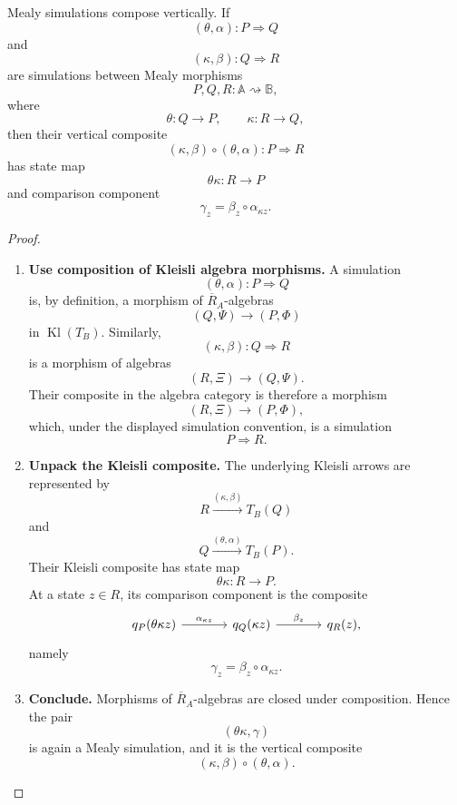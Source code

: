 \begin{proposition}
\label{prop:mealy-simulations-vertical-composition}
    Mealy simulations compose vertically. If
    \[
        (\theta,\alpha):P\Rightarrow Q
    \]
    and
    \[
        (\kappa,\beta):Q\Rightarrow R
    \]
    are simulations between Mealy morphisms
    \[
        P,Q,R:\mathbb A\rightsquigarrow\mathbb B,
    \]
    where
    \[
        \theta:Q\to P,
        \qquad
        \kappa:R\to Q,
    \]
    then their vertical composite
    \[
        (\kappa,\beta)\circ(\theta,\alpha):P\Rightarrow R
    \]
    has state map
    \[
        \theta\kappa:R\to P
    \]
    and comparison component
    \[
        \gamma_z=\beta_z\circ\alpha_{\kappa z}.
    \]
\end{proposition}
\begin{proof}
    \leavevmode
    \begin{enumerate}
        \item \textbf{Use composition of Kleisli algebra morphisms.}
        A simulation
        \[
            (\theta,\alpha):P\Rightarrow Q
        \]
        is, by definition, a morphism of
        \(\overline R_A\)-algebras
        \[
            (Q,\Psi)\to(P,\Phi)
        \]
        in \(\operatorname{Kl}(T_B)\). Similarly,
        \[
            (\kappa,\beta):Q\Rightarrow R
        \]
        is a morphism of algebras
        \[
            (R,\Xi)\to(Q,\Psi).
        \]
        Their composite in the algebra category is therefore a morphism
        \[
            (R,\Xi)\to(P,\Phi),
        \]
        which, under the displayed simulation convention, is a simulation
        \[
            P\Rightarrow R.
        \]

        \item \textbf{Unpack the Kleisli composite.}
        The underlying Kleisli arrows are represented by
        \[
            R\xrightarrow{(\kappa,\beta)}T_B(Q)
        \]
        and
        \[
            Q\xrightarrow{(\theta,\alpha)}T_B(P).
        \]
        Their Kleisli composite has state map
        \[
            \theta\kappa:R\to P.
        \]
        At a state \(z\in R\), its comparison component is the composite
        \[
            \begin{tikzcd}[column sep=large]
                    q_P(\theta\kappa z)
                        \arrow[r, "\alpha_{\kappa z}"]
                &
                    q_Q(\kappa z)
                        \arrow[r, "\beta_z"]
                &
                    q_R(z),
            \end{tikzcd}
        \]
        namely
        \[
            \gamma_z=\beta_z\circ\alpha_{\kappa z}.
        \]

        \item \textbf{Conclude.}
        Morphisms of \(\overline R_A\)-algebras are closed under composition.
        Hence the pair
        \[
            (\theta\kappa,\gamma)
        \]
        is again a Mealy simulation, and it is the vertical composite
        \[
            (\kappa,\beta)\circ(\theta,\alpha).
        \]
    \end{enumerate}
\end{proof}

